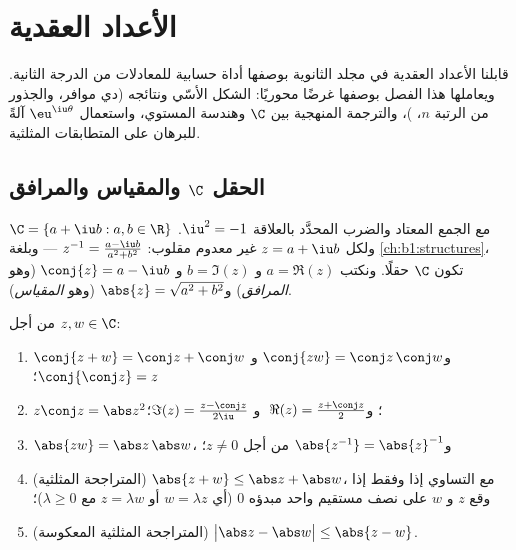\chapter{الأعداد العقدية}\label{ch:b1:complex}

قابلنا الأعداد العقدية في مجلد الثانوية بوصفها أداة حسابية
للمعادلات من الدرجة الثانية. ويعاملها هذا الفصل بوصفها غرضًا
محوريًا: الشكل الأسّي ونتائجه (دي موافر، والجذور من الرتبة $n$،
)، والترجمة المنهجية بين $\C$ وهندسة المستوي، واستعمال
$\eu^{\iu\theta}$ آلةً للبرهان على المتطابقات المثلثية.

\section{الحقل $\C$ والمقياس والمرافق}

\begin{definition}\label{def:b1:complex:field}
$\C = \{a + \iu b : a, b \in \R\}$ مع الجمع المعتاد والضرب المحدَّد
بالعلاقة $\iu^2 = -1$. ولكل $z = a + \iu
b$ غير معدوم مقلوب: $z^{-1} = \frac{a - \iu b}{a^2 + b^2}$ --- وبلغة
\cref{ch:b1:structures}، تكون $\C$ حقلًا. ونكتب $a =
\Re(z)$ و $b = \Im(z)$ و $\conj{z} = a - \iu b$ (وهو
\emph{المرافق}) و$\abs{z} = \sqrt{a^2 + b^2}$
(وهو \emph{المقياس}).
\end{definition}

\begin{proposition}\label{prop:b1:complex:rules}
من أجل $z, w \in \C$:
\begin{enumerate}
  \item $\conj{z + w} = \conj z + \conj w$ و$\conj{zw} = \conj z\,
        \conj w$ و $\conj{\conj z} = z$؛
  \item $z \conj z = \abs z^2$؛ و$\;\Re(z) = \frac{z + \conj z}{2}$ و
        $\Im(z) = \frac{z - \conj z}{2\iu}$؛
  \item $\abs{zw} = \abs z\, \abs w$، و$\abs{z^{-1}} =
        \abs{z}^{-1}$ من أجل $z \neq 0$؛
  \item (المتراجحة المثلثية) $\abs{z + w}
        \leq \abs z + \abs w$، مع التساوي إذا وفقط إذا وقع $z$ و
        $w$ على نصف مستقيم واحد مبدؤه $0$ (أي $w = \lambda z$ أو
        $z = \lambda w$ مع $\lambda \geq 0$)؛
  \item (المتراجحة المثلثية المعكوسة) $\bigl|\abs z - \abs w\bigr|
        \leq \abs{z - w}$.
\end{enumerate}
\end{proposition}

